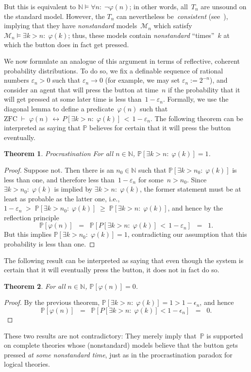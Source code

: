 \documentclass[12pt]{article}
\newcommand{\PP}{\mathbb{P}}
\newcommand{\vp}{\varphi}
\newcommand{\NN}{\mathbb{N}}
\newcommand{\zfc}{\mathrm{ZFC}}
\newcommand{\cM}{\mathcal{M}}
\theoremstyle{plain}
\newtheorem{theorem}{Theorem}[subsection]
\theoremstyle{definition}
\theoremstyle{remark}
\begin{document}
But this is equivalent to $\NN\vDash\forall n{:}\;\neg\vp(n)$; in other words, all~$T_n$ are unsound on the standard model. However, the $T_n$ can nevertheless be~\emph{consistent} (see~\cite{yudkowsky13}), implying that they have \emph{nonstandard} models~$\cM_n$ which satisfy $\cM_n\vDash\exists k>n{:}\;\vp(k)$; thus, these models contain \emph{nonstandard} ``times''~$k$ at which the button does in fact get pressed.

We now formulate an analogue of this argument in terms of reflective, coherent probability  distributions.
To do so, we fix a definable sequence of rational numbers $\varepsilon_n > 0$ such that $\varepsilon_n\to0$ (for example, we may set $\varepsilon_n := 2^{-n}$), and consider an agent that will press the button at time~$n$ if the probability that it will get pressed at some later time is less than~$1-\varepsilon_n$. Formally, we use the diagonal lemma to define a predicate~$\vp(n)$ such that $\zfc\;\vdash\;\vp(n)\,\leftrightarrow\, P[\exists k>n{:}\;\vp(k)] \,<\, 1 - \varepsilon_n$.
The following theorem can be interpreted as saying that $\PP$ believes for certain that it will press the button eventually.
\begin{theorem} \emph{Procrastination}
For all $n\in\NN$, $\PP[\exists k>n{:}\;\vp(k)] = 1$.
\end{theorem}
\begin{proof}
Suppose not. Then there is an $n_0\in\NN$ such that $\PP[\exists k>n_0{:}\;\vp(k)]$ is less than one, and therefore less than~$1 - \varepsilon_n$ for some~$n>n_0$. Since $\exists k>n_0{:}\;\vp(k)$ is implied by $\exists k>n{:}\; \vp(k)$, the former statement must be at least as probable as the latter one, i.e., $1 - \varepsilon_n \;>\; \PP[\exists k>n_0{:}\; \vp(k)] \;\ge\; \PP[\exists k>n{:}\;\vp(k)]$, and hence by the reflection principle
\[
\PP[\vp(n)] \;\;=\;\; \PP[P[\exists k>n{:}\;\vp(k)] \,<\, 1 - \varepsilon_n] \;\;=\;\; 1.
\]
But this implies $\PP[\exists k>n_0{:}\;\vp(k)] = 1$, contradicting our assumption that this probability is less than one.
\end{proof}
The following result can be interpreted as saying that even though the system is certain that it will eventually press the button, it does not in fact do so.
\begin{theorem}
For all $n\in\NN$, $\PP[\vp(n)] = 0$.
\end{theorem}
\begin{proof}
By the previous theorem, $\PP[\exists k>n{:}\;\vp(k)] = 1 > 1 - \epsilon_n$, and hence
\[
\PP[\vp(n)] \;\;=\;\; \PP[P[\exists k>n{:}\;\vp(k)] < 1 - \epsilon_n] \;\;=\;\; 0.
\]
\end{proof}
These two results are not contradictory: They merely imply that~$\PP$ is supported on complete theories whose (nonstandard) models believe that the button gets pressed \emph{at some nonstandard time}, just as in the procrastination paradox for logical theories.
\end{document}

